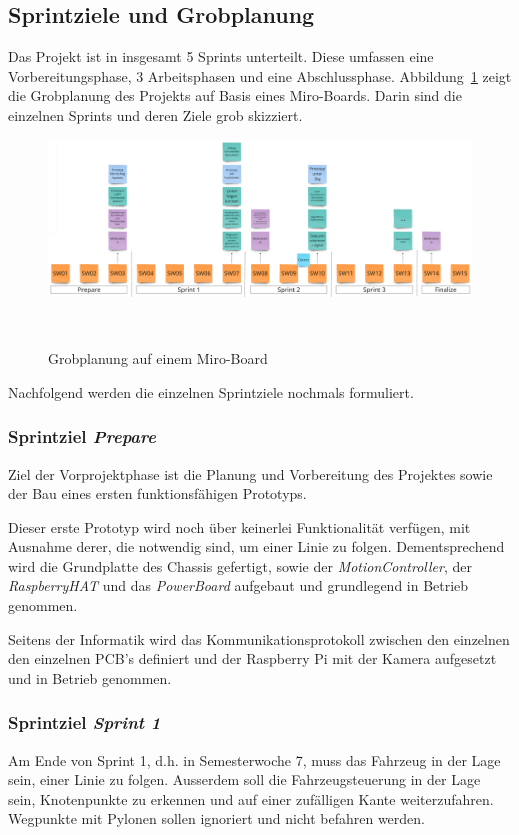 \documentclass[main.tex]{subfiles} %
\begin{document}
\subsection{Sprintziele und Grobplanung}

Das Projekt ist in insgesamt 5 Sprints unterteilt. Diese umfassen eine
Vorbereitungsphase, 3 Arbeitsphasen und eine Abschlussphase.
Abbildung~\ref{fig:Grobplanung} zeigt die Grobplanung des Projekts auf Basis
eines Miro-Boards. Darin sind die einzelnen Sprints und deren Ziele grob
skizziert.

\begin{figure}[h]
    \centering
    \includegraphics[width=1\textwidth]{./Grobplanung_MiroBoard.png}
    \caption{Grobplanung auf einem Miro-Board}~\label{fig:Grobplanung}
\end{figure}

Nachfolgend werden die einzelnen Sprintziele nochmals formuliert.

\subsubsection*{Sprintziel \textit{Prepare}}
Ziel der Vorprojektphase ist die Planung und Vorbereitung des Projektes sowie
der Bau eines ersten funktionsfähigen Prototyps.

Dieser erste Prototyp wird noch über keinerlei Funktionalität verfügen, mit
Ausnahme derer, die notwendig sind, um einer Linie zu folgen. Dementsprechend
wird die Grundplatte des Chassis gefertigt, sowie der
\textit{MotionController}, der \textit{RaspberryHAT} und das
\textit{PowerBoard} aufgebaut und grundlegend in Betrieb genommen.

Seitens der Informatik wird das Kommunikationsprotokoll zwischen den einzelnen
den einzelnen PCB's definiert und der Raspberry Pi mit der Kamera aufgesetzt
und in Betrieb genommen.

\subsubsection*{Sprintziel \textit{Sprint 1}}
Am Ende von Sprint 1, d.h. in Semesterwoche 7, muss das Fahrzeug in der Lage sein,
einer Linie zu folgen. Ausserdem soll die Fahrzeugsteuerung in der Lage sein,
Knotenpunkte zu erkennen und auf einer zufälligen Kante weiterzufahren. Wegpunkte
mit Pylonen sollen ignoriert und nicht befahren werden.
\end{document}
